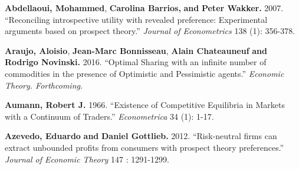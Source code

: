\documentclass[pdftex]{article}
\numberwithin{equation}{section}
\theoremstyle{th}
\newtheorem{proof lemma}{{Proof Lemma}.}
\theoremstyle{definition}
\newtheorem*{risk lovers}{Risk lovers}
\newtheorem*{risk averse}{Risk averse}
\begin{document}
{\begin{thebibliography}{}


\textbf{Abdellaoui, Mohammed}, \textbf{Carolina Barrios,} \textbf{and} \textbf{Peter Wakker.} 2007. ``{Reconciling introspective utility with revealed preference: Experimental arguments based on prospect theory.}'' \emph{Journal of Econometrics} 138 ({1}): 356-378.




\textbf{Araujo, Aloisio}, \textbf{Jean-Marc Bonnisseau}, \textbf{Alain Chateauneuf} \textbf{and} \textbf{Rodrigo Novinski.} 2016. ``{Optimal Sharing with an infinite number of commodities in the presence of Optimistic and Pessimistic agents.}'' \emph{Economic Theory. Forthcoming}.



\textbf{Aumann, Robert J.} 1966.  ``{Existence of Competitive Equilibria in Markets with a Continuum of Traders.}'' \emph{Econometrica} 34 ({1}): 1-17.


\textbf{Azevedo, Eduardo} \textbf{and} \textbf{Daniel Gottlieb.} 2012. ``{Risk-neutral firms can extract unbounded profits from consumers with prospect theory preferences.}'' \emph{Journal of Economic Theory} 147 : 1291-1299.





\end{thebibliography}}
\end{document}
